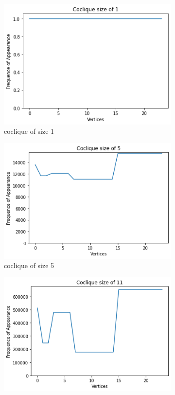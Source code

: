 \documentclass[11pt,a4paper]{article}
\theoremstyle{definition}
\begin{document}
\begin{figure}[hbt!]
	\begin{subfigure}{.5\textwidth}
		\centering
		\includegraphics[width=1\linewidth]{size_1.png}
		\caption{coclique of size 1}
	\end{subfigure}
	\begin{subfigure}{.5\textwidth}
		\centering
		\includegraphics[width=1\linewidth]{size_5.png}
		\caption{coclique of size 5}
	\end{subfigure}
	\begin{subfigure}{.5\textwidth}
		\centering
		\includegraphics[width=1\linewidth]{size_11.png}

\end{subfigure}
\end{figure}
\end{document}

